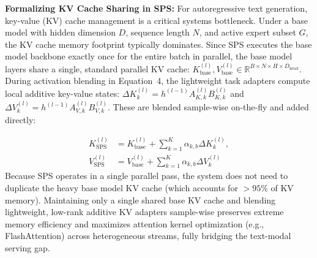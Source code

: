 \begin{itemize}
    \textbf{Formalizing KV Cache Sharing in SPS:} For autoregressive text generation, key-value (KV) cache management is a critical systems bottleneck.
Under a base model with hidden dimension $D$, sequence length $N$, and active expert subset $G$, the KV cache memory footprint typically dominates.
Since SPS executes the base model backbone exactly once for the entire batch in parallel, the base model layers share a single, standard parallel KV cache: $K_{\text{base}}^{(l)}, V_{\text{base}}^{(l)} \in \mathbb{R}^{B \times N \times H \times D_{\text{head}}}$.
During activation blending in Equation~4, the lightweight task adapters compute local additive key-value states: $\Delta K_k^{(l)} = h^{(l-1)} A_{K, k}^{(l)} B_{K, k}^{(l)}$ and $\Delta V_k^{(l)} = h^{(l-1)} A_{V, k}^{(l)} B_{V, k}^{(l)}$.
These are blended sample-wise on-the-fly and added directly:

    \begin{equation}
    \begin{aligned}
        K_{\text{SPS}}^{(l)} &= K_{\text{base}}^{(l)} + \sum_{k=1}^K \alpha_{k, b} \Delta K_k^{(l)}, \\
        V_{\text{SPS}}^{(l)} &= V_{\text{base}}^{(l)} + \sum_{k=1}^K \alpha_{k, b} \Delta V_k^{(l)}
    \end{aligned}
    \end{equation}
    Because SPS operates in a single parallel pass, the system does not need to duplicate the heavy base model KV cache (which accounts for $>95\%$ of KV memory).
Maintaining only a single shared base KV cache and blending lightweight, low-rank additive KV adapters sample-wise preserves extreme memory efficiency and maximizes attention kernel optimization (e.g., FlashAttention) across heterogeneous streams, fully bridging the text-modal serving gap.


\end{itemize}
